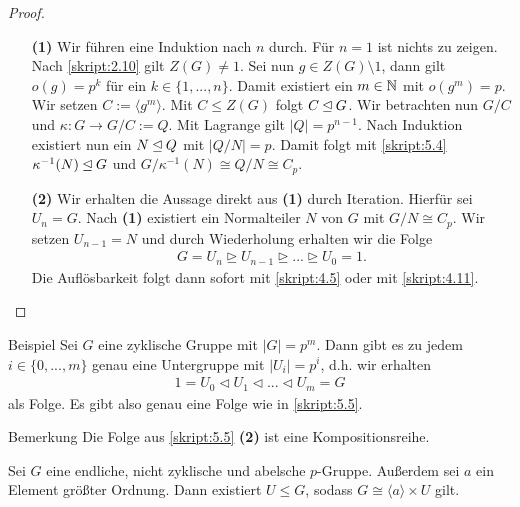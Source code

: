 \begin{proof}\
	\begin{enumerate}
		\item[\textbf{(1)}]
		Wir führen eine Induktion nach $ n $ durch.
		Für $ n = 1 $ ist nichts zu zeigen.
		Nach \ref{skript:2.10} gilt $ Z(G) \neq 1 $.
		Sei nun $ g \in Z(G) \setminus 1 $, dann gilt $ o(g) = p^k $ für ein $ k \in \lbrace 1,...,n \rbrace $. Damit existiert ein $ m \in \mathbb{N} $ mit $ o(g^m) = p  $.
		Wir setzen $ C := \langle g^m  \rangle$. Mit $ C \leq Z(G)  $ folgt $ C \unlhd G $.
		Wir betrachten nun $ G/ C $ und $ \kappa : G \to G/C:=Q $. Mit Lagrange gilt $ |Q| = p^{n-1} $.
		Nach Induktion existiert nun ein $ N \unlhd Q $ mit $ |Q/N| = p $.
		Damit folgt mit \ref{skript:5.4}  $ \kappa^{-1}(N) \unlhd G $ und $ G/\kappa^{-1}(N) \cong Q/N \cong C_p $. 
		
		\item[\textbf{(2)}] 
		Wir erhalten die Aussage direkt aus \textbf{(1)} durch Iteration. Hierfür sei
		$ U_n = G $. Nach \textbf{(1)} existiert ein Normalteiler $ N $ von $ G $ mit 
		$ G / N \cong C_p $. Wir setzen $ U_{n-1} = N $ und durch Wiederholung erhalten wir die Folge
		\begin{align*}
		G = U_n \unrhd U_{n-1} \unrhd ...\unrhd U_0 = 1.
		\end{align*}
		Die Auflösbarkeit folgt dann sofort mit \ref{skript:4.5} oder mit \ref{skript:4.11}.
	\end{enumerate}
\end{proof}

\begin{genericdf}{Beispiel} \label{skript:5.6}
	Sei $ G $ eine zyklische Gruppe mit $ |G| = p^m $.
	Dann gibt es zu jedem $ i \in \lbrace 0,...,m \rbrace $ genau eine Untergruppe mit $ |U_i| = p^i $, d.h. wir erhalten
	\begin{align*}
	1=U_0 \lhd U_1 \lhd ...\lhd U_m = G
	\end{align*}
	als Folge. Es gibt also genau eine Folge wie in \ref{skript:5.5}.
\end{genericdf}

\begin{generic_no_num}{Bemerkung}
	Die Folge aus \ref{skript:5.5} \textbf{(2)} ist eine Kompositionsreihe.
\end{generic_no_num}

\begin{lemma}\label{skript:5.7}
	Sei $ G $ eine endliche, nicht zyklische und abelsche $ p $-Gruppe.
	Außerdem sei $ a $ ein Element größter Ordnung.
	Dann existiert $ U \leq G $, sodass $ G \cong \langle a \rangle \times U $ gilt. 
\end{lemma}

